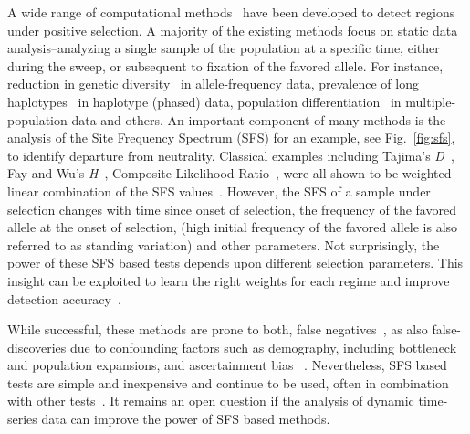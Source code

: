 A wide range of computational methods~\cite{vitti2013detecting} have
been developed to detect regions under positive selection. A majority
of the existing methods focus on static data analysis--analyzing a
single sample of the population at a specific time, either during the
sweep, or subsequent to fixation of the favored allele. For instance,
reduction in genetic
diversity~\cite{tajima1989statistical,fay2000hitchhiking,ronen2013learning}
in allele-frequency data, prevalence of long
haplotypes~\cite{sabeti2006positive,vitti2013detecting} in haplotype
(phased) data, population
differentiation~\cite{holsinger2009genetics,burke2010genome} in
multiple-population data and others. An important component of many
methods is the analysis of the Site Frequency Spectrum (SFS) for an example, 
see 
Fig.~\ref{fig:sfs}, to
identify departure from neutrality. Classical examples including
Tajima's \emph{D}~\cite{tajima1989statistical}, Fay and Wu's
\emph{H}~\cite{fay2000hitchhiking}, Composite Likelihood
Ratio~\cite{nielsen2005genomic}, were all shown to be weighted linear
combination of the SFS values~\cite{achaz2009frequency}. However, the
SFS of a sample under selection changes with time since onset of
selection, the frequency of the favored allele at the onset of
selection, (high initial frequency of the favored allele is also
referred to as standing variation) and other parameters. Not
surprisingly, the power of these SFS based tests depends upon
different selection parameters. This insight can be exploited to learn
the right weights for each regime and improve detection
accuracy~\cite{ronen2013learning}.

While successful, these methods are prone to both, false
negatives~\cite{messer2013population}, as also false-discoveries due
to confounding factors such as demography, including bottleneck and
population expansions, and ascertainment bias ~\cite{ptak2002evidence,
  ramos2002statistical,akey2009constructing,
  nielsen2003correcting,messer2013population}. Nevertheless, SFS based
tests are simple and inexpensive and continue to be used, often in
combination with other
tests~\cite{akey2009constructing,vitti2013detecting}. It remains an
open question if the analysis of dynamic time-series data can improve
the power of SFS based methods.


